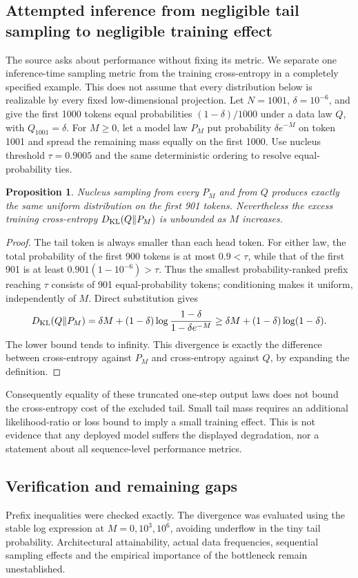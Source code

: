 \documentclass[11pt]{article}
\newtheorem{proposition}{Proposition}
\begin{document}
\subsection{Attempted inference from negligible tail sampling to negligible training effect}
The source asks about performance without fixing its metric. We separate one inference-time sampling metric from the training cross-entropy in a completely specified example. This does not assume that every distribution below is realizable by every fixed low-dimensional projection.
Let $N=1001$, $\delta=10^{-6}$, and give the first 1000 tokens equal probabilities $(1-\delta)/1000$ under a data law $Q$, with $Q_{1001}=\delta$. For $M\ge0$, let a model law $P_M$ put probability $\delta e^{-M}$ on token 1001 and spread the remaining mass equally on the first 1000. Use nucleus threshold $\tau=0.9005$ and the same deterministic ordering to resolve equal-probability ties.
\begin{proposition}
Nucleus sampling from every $P_M$ and from $Q$ produces exactly the same uniform distribution on the first 901 tokens. Nevertheless the excess training cross-entropy $D_{\rm KL}(Q\|P_M)$ is unbounded as $M$ increases.
\end{proposition}
\begin{proof}
The tail token is always smaller than each head token. For either law, the total probability of the first 900 tokens is at most $0.9<\tau$, while that of the first 901 is at least $0.901(1-10^{-6})>\tau$. Thus the smallest probability-ranked prefix reaching $\tau$ consists of 901 equal-probability tokens; conditioning makes it uniform, independently of $M$.
Direct substitution gives
\[
 D_{\rm KL}(Q\|P_M)
 =\delta M+(1-\delta)\log\frac{1-\delta}{1-\delta e^{-M}}
 \ge\delta M+(1-\delta)\log(1-\delta).
\]
The lower bound tends to infinity. This divergence is exactly the difference between cross-entropy against $P_M$ and cross-entropy against $Q$, by expanding the definition.
\end{proof}
Consequently equality of these truncated one-step output laws does not bound the cross-entropy cost of the excluded tail. Small tail mass requires an additional likelihood-ratio or loss bound to imply a small training effect. This is not evidence that any deployed model suffers the displayed degradation, nor a statement about all sequence-level performance metrics.
\subsection{Verification and remaining gaps}
Prefix inequalities were checked exactly. The divergence was evaluated using the stable log expression at $M=0,10^3,10^6$, avoiding underflow in the tiny tail probability. Architectural attainability, actual data frequencies, sequential sampling effects and the empirical importance of the bottleneck remain unestablished.
\end{document}
